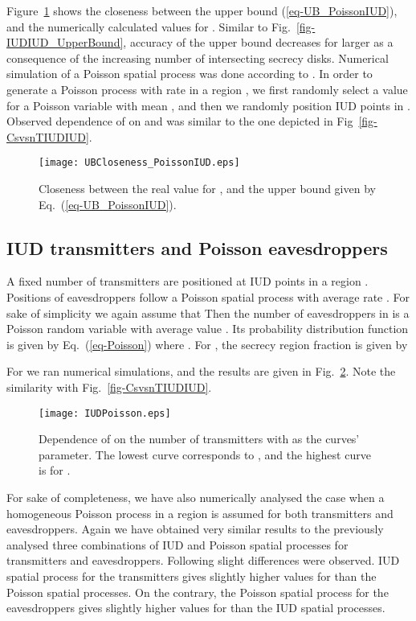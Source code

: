 \documentclass[conference,a4paper]{IEEEtran}
\begin{document}
Figure~\ref{fig-UBCloseness_PoissonIUD} shows the closeness between the upper bound (\ref{eq-UB_PoissonIUD}), and the numerically calculated values for .
Similar to Fig.~\ref{fig-IUDIUD_UpperBound}, accuracy of the upper bound decreases for larger  as a consequence of the increasing number of intersecting secrecy disks.
Numerical simulation of a Poisson spatial process was done according to \cite{Moltchanov-2012}.
In order to generate a Poisson process with rate  in a region , we first randomly select a value  for a Poisson variable with mean ,
and then we randomly position  IUD points in .
Observed dependence of  on  and  was similar to the one depicted in Fig~\ref{fig-CsvsnTIUDIUD}.
\begin{figure}[htbp]
\centering
\texttt{[image: UBCloseness\_PoissonIUD.eps]}
\caption{Closeness between the real value for , and  the upper bound given by Eq.~(\ref{eq-UB_PoissonIUD}).}
\label{fig-UBCloseness_PoissonIUD}
\end{figure}

\addtolength{\textheight}{-3.5cm}

\subsection{IUD transmitters and Poisson eavesdroppers}\label{sec-IUDTxPoissonE}
A fixed number of transmitters  are positioned at IUD points in a region .
Positions of eavesdroppers follow a Poisson spatial process with average rate . 
For sake of simplicity we again assume that 
Then the number of eavesdroppers in  is a Poisson random variable  with average value .
Its probability distribution function is given by Eq.~(\ref{eq-Poisson}) where .
For , the secrecy region fraction is given by


For  we ran numerical simulations, and the results are given in Fig.~\ref{fig-CsvsnTIUDPoisson}. Note the similarity with Fig.~\ref{fig-CsvsnTIUDIUD}.
\begin{figure}[htbp]
\centering
\texttt{[image: IUDPoisson.eps]}
\caption{Dependence of  on the number of transmitters  with  as the curves' parameter.
The lowest curve corresponds to , and the highest curve is for .}
\label{fig-CsvsnTIUDPoisson}
\end{figure}

For sake of completeness, we have also numerically analysed the case when a homogeneous Poisson process in a region  
is assumed for both transmitters and eavesdroppers.
Again we have obtained very similar results to the previously analysed three combinations of IUD and Poisson spatial processes for transmitters and eavesdroppers.
Following slight differences were observed.
IUD spatial process for the transmitters gives slightly higher values for  than the Poisson spatial processes.
On the contrary, the Poisson spatial process for the eavesdroppers gives slightly higher values for  than the IUD spatial processes.
\end{document}
